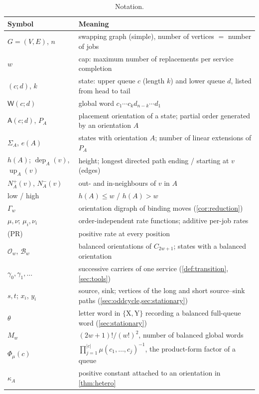 \documentclass[11pt,a4paper]{article}
\theoremstyle{plain}
\theoremstyle{plain}
\newcommand{\W}{\mathsf{W}}
\newcommand{\Or}{\mathsf{A}}
\newcommand{\dep}{\operatorname{dep}}
\newcommand{\up}{\operatorname{up}}
\newcommand{\Nout}{N^{+}}
\newcommand{\Nin}{N^{-}}
\newcommand{\Bal}{\mathcal{B}}
\newcommand{\Obal}{\mathcal{O}}
\newcommand{\G}{\Gamma}
\newcommand{\Sg}{\Sigma}
\begin{document}
\begin{table}[t]
\centering\small
\caption{Notation.}\label{tab:notation}
\begin{tabularx}{\textwidth}{@{}lX@{}}
\toprule
Symbol & Meaning\\
\midrule
$G=(V,E)$, $n$ & swapping graph (simple), number of vertices $=$ number of jobs\\
$w$ & cap: maximum number of replacements per service completion\\
$(c;d)$, $k$ & state: upper queue $c$ (length $k$) and lower queue $d$, listed from head to tail\\
$\W(c;d)$ & global word $c_1\cdots c_k d_{n-k}\cdots d_1$\\
$\Or(c;d)$, $P_A$ & placement orientation of a state; partial order generated by an orientation $A$\\
$\Sg_A$, $e(A)$ & states with orientation $A$; number of linear extensions of $P_A$\\
$h(A)$; $\dep_A(v)$, $\up_A(v)$ & height; longest directed path ending / starting at $v$ (edges)\\
$\Nout_A(v)$, $\Nin_A(v)$ & out- and in-neighbours of $v$ in $A$\\
low / high & $h(A)\le w$ / $h(A)>w$\\
$\G_w$ & orientation digraph of binding moves (\cref{cor:reduction})\\
$\mu,\nu$; $\mu_i,\nu_i$ & order-independent rate functions; additive per-job rates\\
(PR) & positive rate at every position\\
$\Obal_w$, $\Bal_w$ & balanced orientations of $C_{2w+1}$; states with a balanced orientation\\
$\gamma_0,\gamma_1,\dots$ & successive carriers of one service (\cref{def:transition}, \cref{sec:tools})\\
$s,t$; $x_i$, $y_i$ & source, sink; vertices of the long and short source--sink paths (\cref{sec:oddcycle,sec:stationary})\\
$\theta$ & letter word in $\{\mathrm X,\mathrm Y\}$ recording a balanced full-queue word (\cref{sec:stationary})\\
$M_w$ & $(2w+1)!/(w!)^2$, number of balanced global words\\
$\Phi_\mu(c)$ & $\prod_{j=1}^{|c|}\mu(c_1,\dots,c_j)^{-1}$, the product-form factor of a queue\\
$\kappa_A$ & positive constant attached to an orientation in \cref{thm:hetero}\\
\bottomrule
\end{tabularx}
\end{table}
\end{document}

